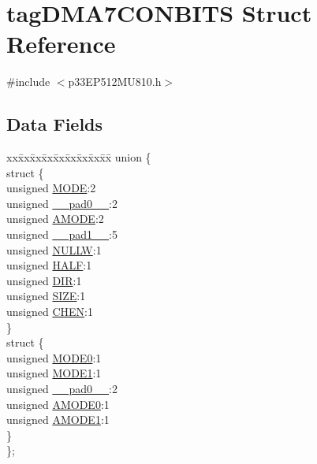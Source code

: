 \hypertarget{structtag_d_m_a7_c_o_n_b_i_t_s}{}\section{tag\+D\+M\+A7\+C\+O\+N\+B\+I\+TS Struct Reference}
\label{structtag_d_m_a7_c_o_n_b_i_t_s}


{\ttfamily \#include $<$p33\+E\+P512\+M\+U810.\+h$>$}

\subsection*{Data Fields}
\begin{DoxyCompactItemize}
\item 
\begin{tabbing}
xx\=xx\=xx\=xx\=xx\=xx\=xx\=xx\=xx\=\kill
union \{\\
\>struct \{\\
\>\>unsigned \hyperlink{structtag_d_m_a7_c_o_n_b_i_t_s_adc56ba18ff3f1599c85d222bee624424}{MODE}:2\\
\>\>unsigned \hyperlink{structtag_d_m_a7_c_o_n_b_i_t_s_adf71f3d8410c1f1dbbc96680a92c49af}{\_\_pad0\_\_}:2\\
\>\>unsigned \hyperlink{structtag_d_m_a7_c_o_n_b_i_t_s_ab3ff4e1f1b9a1037418ca7b6cb2e8f77}{AMODE}:2\\
\>\>unsigned \hyperlink{structtag_d_m_a7_c_o_n_b_i_t_s_acaf2d0924a107ec6e8d2e31febaf66f9}{\_\_pad1\_\_}:5\\
\>\>unsigned \hyperlink{structtag_d_m_a7_c_o_n_b_i_t_s_a1d3f7d04416314131889d1671a9287ad}{NULLW}:1\\
\>\>unsigned \hyperlink{structtag_d_m_a7_c_o_n_b_i_t_s_a1a715a64b2576f59401ac93d6f9a086a}{HALF}:1\\
\>\>unsigned \hyperlink{structtag_d_m_a7_c_o_n_b_i_t_s_ad6868749602045a76f36ffdf964dfd39}{DIR}:1\\
\>\>unsigned \hyperlink{structtag_d_m_a7_c_o_n_b_i_t_s_a5863cac6dc2cb330bdd0b1c66da70ffe}{SIZE}:1\\
\>\>unsigned \hyperlink{structtag_d_m_a7_c_o_n_b_i_t_s_a092934036fdfb8df5259db288fe438ca}{CHEN}:1\\
\>\} \\
\>struct \{\\
\>\>unsigned \hyperlink{structtag_d_m_a7_c_o_n_b_i_t_s_abc938903e74bff48935569d0c5b19035}{MODE0}:1\\
\>\>unsigned \hyperlink{structtag_d_m_a7_c_o_n_b_i_t_s_a7a9f7514566d0626724ce6c4b81b5ea2}{MODE1}:1\\
\>\>unsigned \hyperlink{structtag_d_m_a7_c_o_n_b_i_t_s_adf71f3d8410c1f1dbbc96680a92c49af}{\_\_pad0\_\_}:2\\
\>\>unsigned \hyperlink{structtag_d_m_a7_c_o_n_b_i_t_s_a0a1f894a2695c1388a5412244636805b}{AMODE0}:1\\
\>\>unsigned \hyperlink{structtag_d_m_a7_c_o_n_b_i_t_s_a3fde4abc0dc3db6fef6afc28c565ce3e}{AMODE1}:1\\
\>\} \\
\}; \\


\end{tabbing}
\end{DoxyCompactItemize}

